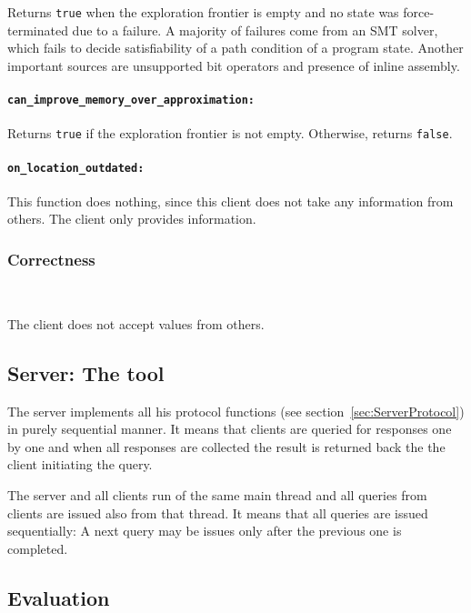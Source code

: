\documentclass[envcountsame]{llncs}
\begin{document}
Returns \texttt{true} when the exploration frontier is empty and no state was
force-terminated due to a failure. A majority of failures come from an SMT
solver, which fails to decide satisfiability of a path condition of a program
state. Another important sources are unsupported bit operators and presence of
inline assembly.

\paragraph{\tt can\_improve\_memory\_over\_approximation: }

Returns \texttt{true} if the exploration frontier is not empty. Otherwise,
returns \texttt{false}.

\paragraph{\tt on\_location\_outdated: }

This function does nothing, since this client does not take any information from
others. The client only provides information.

\subsubsection{Correctness}~\\
\label{sec:CorrectnessSE}

The client does not accept values from others.


\subsection{Server: The tool}
\label{sec:ServerSTATOR}

The server implements all his protocol functions (see
section~\ref{sec:ServerProtocol}) in purely sequential manner. It means that
clients are queried for responses one by one and when all responses are
collected the result is returned back the the client initiating the query.

The server and all clients run of the same main thread and all queries from
clients are issued also from that thread. It means that all queries are issued
sequentially: A next query may be issues only after the previous one is
completed.


\subsection{Evaluation}
\label{sec:Evaluation}
\end{document}
